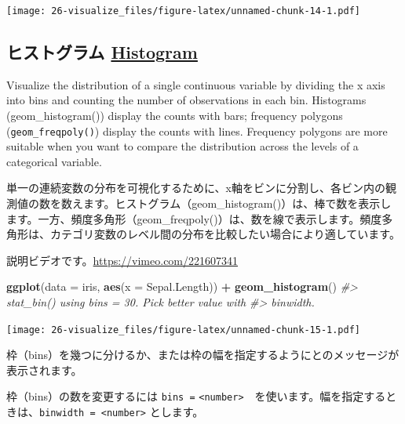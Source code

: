 \documentclass[
  xelatex, ja=standard]{bxjsbook}
\newenvironment{Shaded}{\begin{snugshade}}{\end{snugshade}}
\newcommand{\AttributeTok}[1]{\textcolor[rgb]{0.13,0.29,0.53}{#1}}
\newcommand{\CommentTok}[1]{\textcolor[rgb]{0.56,0.35,0.01}{\textit{#1}}}
\newcommand{\FunctionTok}[1]{\textcolor[rgb]{0.13,0.29,0.53}{\textbf{#1}}}
\newcommand{\NormalTok}[1]{#1}
\newcommand{\SpecialCharTok}[1]{\textcolor[rgb]{0.81,0.36,0.00}{\textbf{#1}}}
\theoremstyle{definition}
\theoremstyle{definition}
\theoremstyle{definition}
\theoremstyle{definition}
\theoremstyle{remark}
\begin{document}
\texttt{[image: 26-visualize\_files/figure-latex/unnamed-chunk-14-1.pdf]}

\hypertarget{ux30d2ux30b9ux30c8ux30b0ux30e9ux30e0-histogram}{%
\subsection{\texorpdfstring{ヒストグラム \href{https://ggplot2.tidyverse.org/reference/geom_histogram.html}{Histogram}}{ヒストグラム Histogram}}\label{ux30d2ux30b9ux30c8ux30b0ux30e9ux30e0-histogram}}

Visualize the distribution of a single continuous variable by dividing the x axis into bins and counting the number of observations in each bin. Histograms (geom\_histogram()) display the counts with bars; frequency polygons (\texttt{geom\_freqpoly()}) display the counts with lines. Frequency polygons are more suitable when you want to compare the distribution across the levels of a categorical variable.

単一の連続変数の分布を可視化するために、x軸をビンに分割し、各ビン内の観測値の数を数えます。ヒストグラム（geom\_histogram()）は、棒で数を表示します。一方、頻度多角形（geom\_freqpoly()）は、数を線で表示します。頻度多角形は、カテゴリ変数のレベル間の分布を比較したい場合により適しています。

説明ビデオです。\url{https://vimeo.com/221607341}

\begin{Shaded}
\begin{Highlighting}[]
\FunctionTok{ggplot}\NormalTok{(}\AttributeTok{data =}\NormalTok{ iris, }\FunctionTok{aes}\NormalTok{(}\AttributeTok{x =}\NormalTok{ Sepal.Length)) }\SpecialCharTok{+}
  \FunctionTok{geom\_histogram}\NormalTok{()}
\CommentTok{\#\textgreater{} \textasciigrave{}stat\_bin()\textasciigrave{} using \textasciigrave{}bins = 30\textasciigrave{}. Pick better value with}
\CommentTok{\#\textgreater{} \textasciigrave{}binwidth\textasciigrave{}.}
\end{Highlighting}
\end{Shaded}

\texttt{[image: 26-visualize\_files/figure-latex/unnamed-chunk-15-1.pdf]}

枠（bins）を幾つに分けるか、または枠の幅を指定するようにとのメッセージが表示されます。

枠（bins）の数を変更するには \texttt{bins\ =} \texttt{\textless{}number\textgreater{}}　を使います。幅を指定するときは、\texttt{binwidth\ =\ \textless{}number\textgreater{}} とします。
\end{document}
